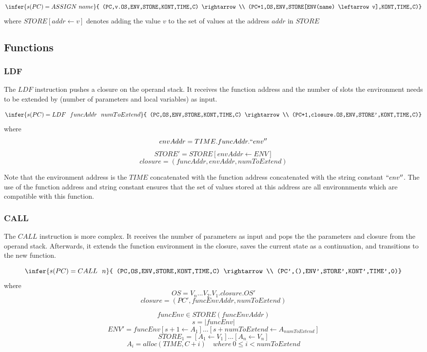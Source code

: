 \documentclass[12pt]{article}
\begin{document}
$$\infer{s(PC) = ASSIGN\ name}{
  (PC,v.OS,ENV,STORE,KONT,TIME,C) \rightarrow \\
  (PC+1,OS,ENV,STORE[ENV(name) \leftarrow v],KONT,TIME,C)}$$
where $STORE[addr \leftarrow v]$ denotes adding the value $v$ to the set of values at the address $addr$ in $STORE$

\subsection{Functions}
\subsubsection{LDF}
The $LDF$ instruction pushes a closure on the operand stack. It receives the function address and the number of slots the environment needs to be extended by (number of parameters and local variables) as input.

$$\infer{s(PC) = LDF\ \ funcAddr\ \ numToExtend}{
    (PC,OS,ENV,STORE,KONT,TIME,C) \rightarrow \\
    (PC+1,closure.OS,ENV,STORE',KONT,TIME,C)}$$
where
$$envAddr=TIME.funcAddr.``env''$$
$$STORE'=STORE[envAddr \leftarrow ENV]$$
$$closure=(funcAddr,envAddr,numToExtend)$$

Note that the environment address is the $TIME$ concatenated with the function address concatenated with the string constant $``env''$. The use of the function address and string constant ensures that the set of values stored at this address are all environnments which are compatible with this function.

\subsubsection{CALL}
The $CALL$ instruction is more complex. It receives the number of parameters as input and pops the the parameters and closure from the operand stack. Afterwards, it extends the function environment in the closure, saves the current state as a continuation, and transitions to the new function.

$$\infer{s(PC) = CALL\ \ n}{
    (PC,OS,ENV,STORE,KONT,TIME,C) \rightarrow \\
    (PC',(),ENV',STORE',KONT',TIME',0)}$$
where
$$OS=V_n...V_2.V_1.closure.OS'$$
$$closure=(PC',funcEnvAddr,numToExtend)$$

$$funcEnv \in STORE(funcEnvAddr)$$
$$s=|funcEnv|$$
$$ENV'=funcEnv[s+1 \leftarrow A_1]...[s+numToExtend \leftarrow A_{numToExtend}]$$
$$STORE_1=[A_1 \leftarrow V_1]...[A_n \leftarrow V_n]$$
$$A_i=alloc(TIME,C+i) \quad where\ 0 \leq i < numToExtend$$
\end{document}
